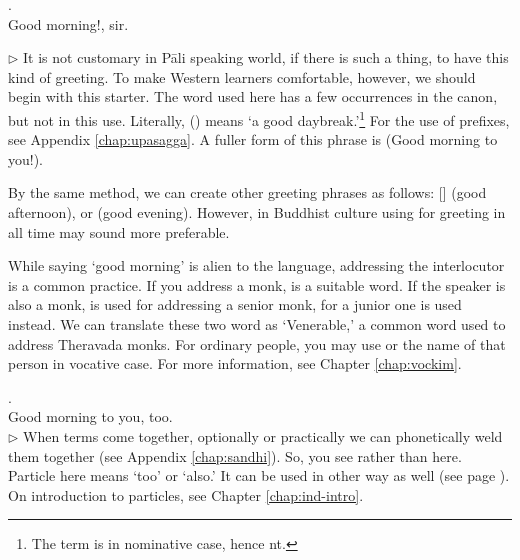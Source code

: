 \bigskip
\setcounter{convnum}{1}
. \\
\hspace*{10mm}Good morning!, sir.\\
{\small $\triangleright$ It is not customary in P\=ali speaking world, if there is such a thing, to have this kind of greeting. To make Western learners comfortable, however, we should begin with this starter. The word used here has a few occurrences in the canon, but not in this use. Literally,  () means `a good daybreak.'\footnote{The term is in nominative case, hence nt.} For the use of prefixes, see Appendix \ref{chap:upasagga}. A fuller form of this phrase is  (Good morning to you!).

By the same method, we can create other greeting phrases as follows:  [] (good afternoon),  or  (good evening). However, in Buddhist culture using  for greeting in all time may sound more preferable.

While saying `good morning' is alien to the language, addressing the interlocutor is a common practice. If you address a monk,  is a suitable word. If the speaker is also a monk,  is used for addressing a senior monk, for a junior one  is used instead. We can translate these two word as `Venerable,' a common word used to address Theravada monks. For ordinary people, you may use  or the name of that person in vocative case. For more information, see Chapter \ref{chap:vockim}.}

\medskip
{}. \\
\hspace*{10mm}Good morning to you, too.\\
{\small $\triangleright$ When terms come together, optionally or practically we can phonetically weld them together (see Appendix \ref{chap:sandhi}). So, you see  rather than  here. Particle  here means `too' or `also.' It can be used in other way as well (see page \pageref{nip:pi}). On introduction to particles, see Chapter \ref{chap:ind-intro}.}

